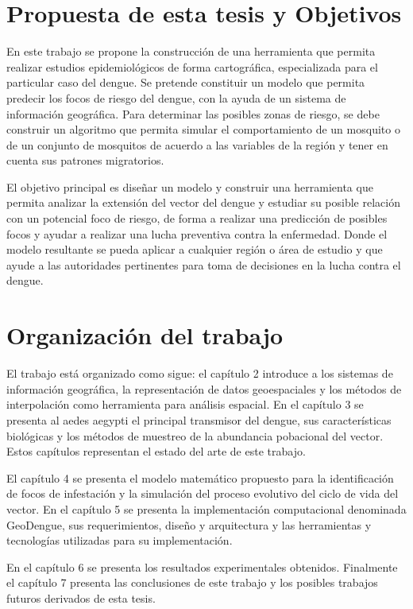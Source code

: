\section{Propuesta de esta tesis y Objetivos}
En este trabajo se propone la construcción de una herramienta que permita realizar estudios
epidemiológicos de forma cartográfica, especializada para el particular caso del dengue. Se
pretende constituir un modelo que permita predecir los focos de riesgo del dengue, con la ayuda de
un sistema de información geográfica. Para determinar las posibles zonas de riesgo, se debe
construir un algoritmo que permita simular el comportamiento de un mosquito o de un conjunto de
mosquitos de acuerdo a las variables de la región y tener en cuenta sus patrones migratorios.

El objetivo principal es diseñar un modelo y construir una herramienta que permita analizar la
extensión del vector del dengue y estudiar su posible relación con un potencial foco de riesgo, de
forma a realizar una predicción de posibles focos y ayudar a realizar una lucha preventiva contra
la enfermedad. Donde el modelo resultante se pueda aplicar a cualquier región o área de estudio y
que ayude a las autoridades pertinentes para toma de decisiones en la lucha contra el dengue.

\section{Organización del trabajo}
El trabajo está organizado como sigue: el capítulo 2 introduce a los sistemas de información
geográfica, la representación de datos geoespaciales y los métodos de interpolación como
herramienta para análisis espacial. En el capítulo 3 se presenta al aedes aegypti el principal
transmisor del dengue, sus características biológicas y los métodos de muestreo de la abundancia
pobacional del vector. Estos capítulos representan el estado del arte de este trabajo.

El capítulo 4 se presenta el modelo matemático propuesto para la identificación de focos de
infestación y la simulación del proceso evolutivo del ciclo de vida del vector. En el capítulo 5
se presenta la implementación computacional denominada GeoDengue, sus requerimientos, diseño y
arquitectura y las herramientas y tecnologías utilizadas para su implementación.

En el capítulo 6 se presenta los resultados experimentales obtenidos. Finalmente el capítulo 7
presenta las conclusiones de este trabajo y los  posibles trabajos futuros derivados de esta tesis.
